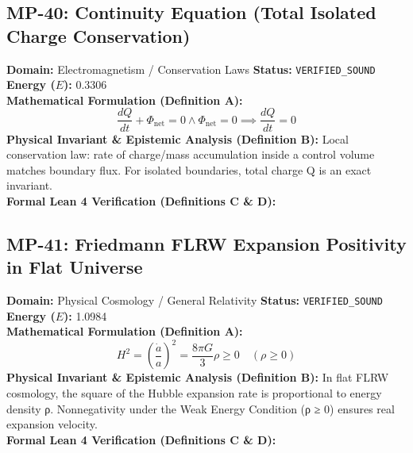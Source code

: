 \vspace{1em}
\subsection{MP-40: Continuity Equation (Total Isolated Charge Conservation)}
\textbf{Domain:} Electromagnetism / Conservation Laws \hfill \textbf{Status:} \texttt{VERIFIED\_SOUND} \hfill \textbf{Energy ($E$):} 0.3306\\
\textbf{Mathematical Formulation (Definition A):}
\begin{equation*}
\frac{dQ}{dt} + \Phi_{\text{net}} = 0 \wedge \Phi_{\text{net}} = 0 \implies \frac{dQ}{dt} = 0
\end{equation*}
\textbf{Physical Invariant \& Epistemic Analysis (Definition B):}
Local conservation law: rate of charge/mass accumulation inside a control volume matches boundary flux. For isolated boundaries, total charge Q is an exact invariant.\\

\textbf{Formal Lean 4 Verification (Definitions C \& D):}


\vspace{1em}
\subsection{MP-41: Friedmann FLRW Expansion Positivity in Flat Universe}
\textbf{Domain:} Physical Cosmology / General Relativity \hfill \textbf{Status:} \texttt{VERIFIED\_SOUND} \hfill \textbf{Energy ($E$):} 1.0984\\
\textbf{Mathematical Formulation (Definition A):}
\begin{equation*}
H^2 = \left(\frac{\dot{a}}{a}\right)^2 = \frac{8\pi G}{3} \rho \ge 0 \quad (\rho \ge 0)
\end{equation*}
\textbf{Physical Invariant \& Epistemic Analysis (Definition B):}
In flat FLRW cosmology, the square of the Hubble expansion rate is proportional to energy density ρ. Nonnegativity under the Weak Energy Condition (ρ ≥ 0) ensures real expansion velocity.\\

\textbf{Formal Lean 4 Verification (Definitions C \& D):}


\vspace{1em}
